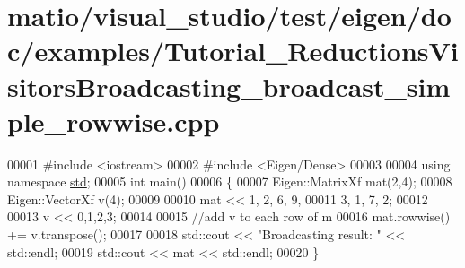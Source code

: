 \hypertarget{matio_2visual__studio_2test_2eigen_2doc_2examples_2_tutorial___reductions_visitors_broadcasting_d7282aabc91526e55c40ef9947a81255_source}{}\section{matio/visual\+\_\+studio/test/eigen/doc/examples/\+Tutorial\+\_\+\+Reductions\+Visitors\+Broadcasting\+\_\+broadcast\+\_\+simple\+\_\+rowwise.cpp}
\label{matio_2visual__studio_2test_2eigen_2doc_2examples_2_tutorial___reductions_visitors_broadcasting_d7282aabc91526e55c40ef9947a81255_source}

\begin{DoxyCode}
00001 \textcolor{preprocessor}{#include <iostream>}
00002 \textcolor{preprocessor}{#include <Eigen/Dense>}
00003 
00004 \textcolor{keyword}{using namespace }\hyperlink{namespacestd}{std};
00005 \textcolor{keywordtype}{int} main()
00006 \{
00007   Eigen::MatrixXf mat(2,4);
00008   Eigen::VectorXf v(4);
00009   
00010   mat << 1, 2, 6, 9,
00011          3, 1, 7, 2;
00012          
00013   v << 0,1,2,3;
00014        
00015   \textcolor{comment}{//add v to each row of m}
00016   mat.rowwise() += v.transpose();
00017   
00018   std::cout << \textcolor{stringliteral}{"Broadcasting result: "} << std::endl;
00019   std::cout << mat << std::endl;
00020 \}
\end{DoxyCode}
